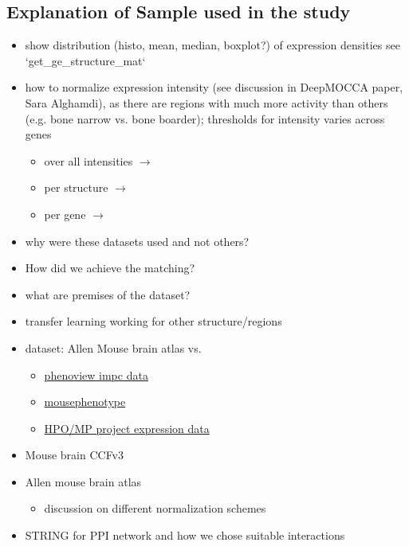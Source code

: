 \documentclass[]{article}
\renewcommand{\cite}{\citep}
\begin{document}
\subsection*{Explanation of Sample used in the study}
\begin{itemize}
	\item show distribution (histo, mean, median, boxplot?) of expression densities see `get\_ge\_structure\_mat`

	\item how to normalize expression intensity (see discussion in DeepMOCCA paper, Sara Alghamdi), as there are regions with much more activity than others (e.g. bone narrow vs. bone boarder); thresholds for intensity varies across genes
	
	\begin{itemize}
		\item over all intensities $\rightarrow$
		\item per structure $\rightarrow$  
		\item per gene $\rightarrow$ 
	\end{itemize}
\end{itemize}

\begin{itemize}
	\item why were these datasets used and not others?
	\item How did we achieve the matching?
	\item what are premises of the dataset?
	
	\item transfer learning working for other structure/regions
	\item dataset: Allen Mouse brain atlas vs. 
	\begin{itemize}
		\item \href{https://www.har.mrc.ac.uk/harwell-news/phenoview-new-tool-compare-impc-data/}{phenoview impc data}
		
		\item \href{https://www.mousephenotype.org/}{mousephenotype}
		
		\item \href{http://www.informatics.jax.org/expression.shtml}{HPO/MP project expression data}
	\end{itemize}
	\item Mouse brain CCFv3
\end{itemize}
\begin{itemize}
	\item Allen mouse brain atlas \cite{MouseBrainAtlas}
	\begin{itemize}
		\item discussion on different normalization schemes
	\end{itemize}
	\item STRING for PPI network and how we chose suitable interactions \cite{STRINGv10}
\end{itemize}
\end{document}
